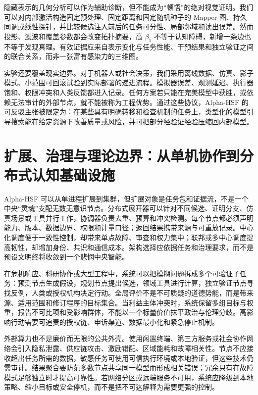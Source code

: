 隐藏表示的几何分析可以作为辅助诊断，但不能成为“顿悟”的绝对视觉证明。我们可以对内部激活构造固定预处理、固定距离和固定随机种子的 Mapper 图、持久同调或线性探针，并比较候选注入前后的任务可分性、局部邻域和读出误差。然而投影、滤波和覆盖参数都会改变拓扑摘要，高 $\beta_1$ 不等于认知障碍，新增一条边也不等于发现真理。有效证据应来自表示变化与任务性能、干预结果和独立验证之间的联合关系，而非一张富有感染力的三维图。

实验还要覆盖现实边界。对于机器人或社会决策，我们采用离线数据、仿真、影子模式、小范围可回滚试验到实际部署的递进流程。模拟器误差、观测延迟、执行器饱和、权限冲突和人类反馈都进入记录。任何方案若只能在完美模型中获胜，或依赖无法审计的外部节点，就不能被称为工程优势。通过这些协议，Alpha-HSF 的可反驳主张被限定为：在某些具有明确转移和检查机制的任务上，类型化的模型引导搜索能在给定资源下改善质量或风险，并可把部分经验证经验压缩回内部模型。

\section{扩展、治理与理论边界：从单机协作到分布式认知基础设施}
\label{sec:alpha_hsf_conclusion}

Alpha-HSF 可以从单进程扩展到集群，但扩展对象是任务包和证据流，不是一个中央“灵魂”支配无数无意识节点。分布式展开器可以针对不同候选、证明分支、仿真场景或工具并行工作，协调器负责去重、预算和冲突检测。每个节点都必须声明能力、版本、数据边界、权限和计量口径；返回结果携带来源与可重放记录。中心化调度便于一致性控制，却带来单点故障、审查和权力集中；联邦或多中心调度提高韧性，却增加身份、共识和通信成本。架构选择应依据任务和治理要求，而不是预设文明终将收敛到一个悲悯中央智能。

在危机响应、科研协作或大型工程中，系统可以把模糊问题拆成多个可验证子任务：预测节点生成假设，规划节点提出候选，领域工具进行计算，独立验证节点寻找反例，人类或授权机构决定行动。全局评价不是不可质疑的道德势能，而是带来源、适用范围和修订程序的目标集合。当利益主体冲突时，系统保留多组目标与权重，报告不可比项和受影响群体，不能以一个标量价值抹平政治与伦理分歧。高影响行动需要可追责的授权链、申诉渠道、数据最小化和紧急停止机制。

外部算力也不是廉价而无限的公共外壳。使用闲置终端、第三方服务或社会协作网络会引入隐私泄露、供应链攻击、激励错配、区域能耗和故障相关性。节点不应接收超出任务所需的数据，敏感任务可使用可信执行环境或本地验证，但这些技术仍需审计。结果聚合要防范多数节点共享同一模型而形成相关错误；冗余只有在故障模式足够独立时才提高可靠性。若网络分区或远端服务不可用，系统应降级到本地策略、缩小目标或安全停机，而不是把不可达解释为需要更强的控制。

